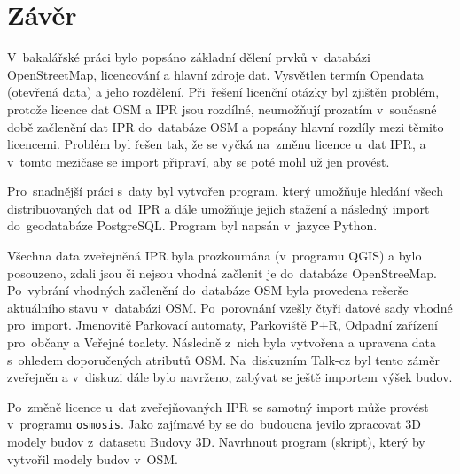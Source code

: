 \chapter{Závěr}
\label{5-zaver}

V~bakalářské práci bylo popsáno základní dělení prvků v~databázi
OpenStreetMap, licencování a hlavní zdroje dat. Vysvětlen termín
Opendata (otevřená data) a jeho rozdělení.
Při~řešení licenční otázky byl zjištěn problém, protože licence dat
OSM a IPR jsou rozdílné, neumožňují prozatím v~současné době začlenění
dat IPR do~databáze OSM a popsány hlavní rozdíly mezi těmito licencemi.
Problém byl řešen tak, že se vyčká na~změnu licence u~dat IPR, a
v~tomto mezičase se import připraví, aby se poté mohl už jen provést.


Pro~snadnější práci s~daty byl vytvořen program, který umožňuje hledání
všech distribuovaných dat od~IPR a dále umožňuje jejich stažení a
následný import do~geodatabáze PostgreSQL. Program byl napsán v~jazyce
Python.


Všechna data zveřejněná IPR byla prozkoumána (v~programu QGIS)
a bylo posouzeno, zdali jsou či nejsou vhodná začlenit je do~databáze
OpenStreeMap. Po~vybrání vhodných začlenění do~databáze OSM byla
provedena rešerše aktuálního stavu v~databázi OSM.
Po~porovnání vzešly čtyři datové sady vhodné pro~import.
Jmenovitě Parkovací automaty, Parkoviště P+R, Odpadní zařízení
pro~občany a Veřejné toalety. Následně z~nich byla vytvořena a upravena
data s~ohledem doporučených atributů OSM.
Na~diskuzním Talk-cz byl tento záměr zveřejněn a v~diskuzi dále bylo
navrženo, zabývat se ještě importem výšek budov.


Po~změně licence u~dat zveřejňovaných IPR se samotný import může provést
v~programu {\tt osmosis}.
Jako zajímavé by se do~budoucna jevilo zpracovat 3D modely budov
z~datasetu Budovy 3D. Navrhnout program (skript), který by vytvořil
modely budov v~OSM.
